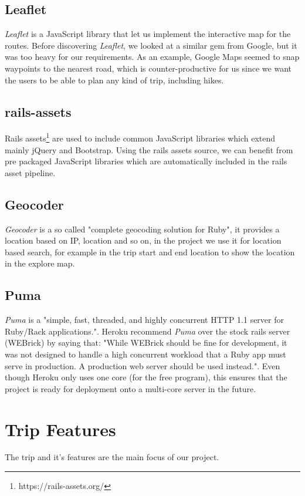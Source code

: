 \documentclass[a4paper]{article}
\begin{document}
\subsection{Leaflet}
\textit{Leaflet}\cite{leaflet} is a JavaScript library that let us implement the interactive map for the routes. Before discovering \textit{Leaflet}, we looked at a similar gem from Google, but it was too heavy for our requirements. As an example, Google Maps seemed to snap waypoints to the nearest road, which is counter-productive for us since we want the users to be able to plan any kind of trip, including hikes.

\subsection{rails-assets}
Rails assets\footnote{https://rails-assets.org/} are used to include common JavaScript libraries which extend mainly jQuery and Bootstrap. Using the rails assets source, we can benefit from pre packaged JavaScript libraries which are automatically included in the rails asset pipeline.

\subsection{Geocoder}
\textit{Geocoder} is a so called "complete geocoding solution for Ruby"\cite{geocoder}, it provides a location based on IP, location and so on, in the project we use it for location based search, for example in the trip start and end location to show the location in the explore map. 

\subsection{Puma}
\textit{Puma} is a "simple, fast, threaded, and highly concurrent HTTP 1.1 server for Ruby/Rack applications."\cite{puma}. Heroku recommend \textit{Puma} over the stock rails server (WEBrick) by saying that: "While WEBrick should be fine for development, it was not designed to handle a high concurrent workload that a Ruby app must serve in production. A production web server should be used instead."\cite{heroku}. Even though Heroku only uses one core (for the free program), this ensures that the project is ready for deployment onto a multi-core server in the future.  


\section{Trip Features}
The trip and it's features are the main focus of our project. 
\end{document}
